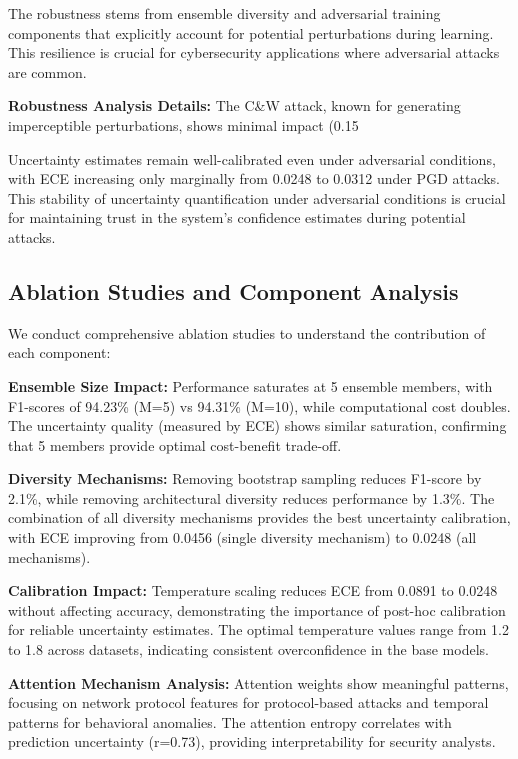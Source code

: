 \documentclass[journal]{IEEEtran}
\begin{document}
The robustness stems from ensemble diversity and adversarial training components that explicitly account for potential perturbations during learning. This resilience is crucial for cybersecurity applications where adversarial attacks are common.

\textbf{Robustness Analysis Details:} The C\&W attack, known for generating imperceptible perturbations, shows minimal impact (0.15%

Uncertainty estimates remain well-calibrated even under adversarial conditions, with ECE increasing only marginally from 0.0248 to 0.0312 under PGD attacks. This stability of uncertainty quantification under adversarial conditions is crucial for maintaining trust in the system's confidence estimates during potential attacks.

\subsection{Ablation Studies and Component Analysis}

We conduct comprehensive ablation studies to understand the contribution of each component:

\textbf{Ensemble Size Impact:} Performance saturates at 5 ensemble members, with F1-scores of 94.23\% (M=5) vs 94.31\% (M=10), while computational cost doubles. The uncertainty quality (measured by ECE) shows similar saturation, confirming that 5 members provide optimal cost-benefit trade-off.

\textbf{Diversity Mechanisms:} Removing bootstrap sampling reduces F1-score by 2.1\%, while removing architectural diversity reduces performance by 1.3\%. The combination of all diversity mechanisms provides the best uncertainty calibration, with ECE improving from 0.0456 (single diversity mechanism) to 0.0248 (all mechanisms).

\textbf{Calibration Impact:} Temperature scaling reduces ECE from 0.0891 to 0.0248 without affecting accuracy, demonstrating the importance of post-hoc calibration for reliable uncertainty estimates. The optimal temperature values range from 1.2 to 1.8 across datasets, indicating consistent overconfidence in the base models.

\textbf{Attention Mechanism Analysis:} Attention weights show meaningful patterns, focusing on network protocol features for protocol-based attacks and temporal patterns for behavioral anomalies. The attention entropy correlates with prediction uncertainty (r=0.73), providing interpretability for security analysts.
\end{document}
